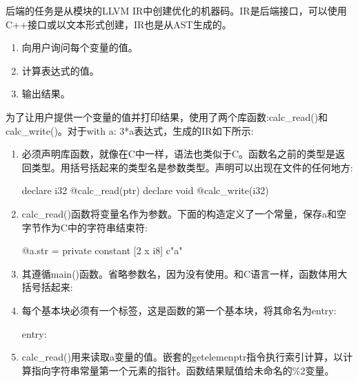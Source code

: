 
后端的任务是从模块的LLVM IR中创建优化的机器码。IR是后端接口，可以使用C++接口或以文本形式创建，IR也是从AST生成的。


\begin{enumerate}
\item
向用户询问每个变量的值。

\item
计算表达式的值。

\item
输出结果。
\end{enumerate}

为了让用户提供一个变量的值并打印结果，使用了两个库函数:calc\_read()和calc\_write()。对于with a: 3*a表达式，生成的IR如下所示:

\begin{enumerate}
\item
必须声明库函数，就像在C中一样，语法也类似于C。函数名之前的类型是返回类型。用括号括起来的类型名是参数类型。声明可以出现在文件的任何地方:

\begin{shell}
declare i32 @calc_read(ptr)
declare void @calc_write(i32)
\end{shell}

\item
calc\_read()函数将变量名作为参数。下面的构造定义了一个常量，保存a和空字节作为C中的字符串结束符:

\begin{shell}
@a.str = private constant [2 x i8] c"a"
\end{shell}

\item
其遵循main()函数。省略参数名，因为没有使用。和C语言一样，函数体用大括号括起来:

\begin{shell}
define i32 @main(i32, ptr) {
\end{shell}

\item
每个基本块必须有一个标签，这是函数的第一个基本块，将其命名为entry:

\begin{shell}
entry:
\end{shell}

\item
calc\_read()用来读取a变量的值。嵌套的getelemenptr指令执行索引计算，以计算指向字符串常量第一个元素的指针。函数结果赋值给未命名的\%2变量。

\begin{shell}
\end{shell}


\end{enumerate}
